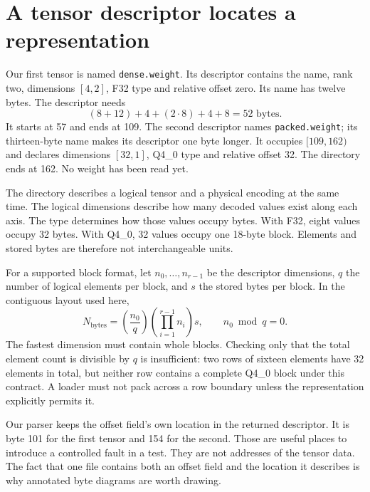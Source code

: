 \section{A tensor descriptor locates a representation}
Our first tensor is named \texttt{dense.weight}. Its descriptor
contains the name, rank two, dimensions $[4,2]$, F32 type and relative
offset zero. Its name has twelve bytes. The descriptor needs
\[
(8+12)+4+(2\cdot8)+4+8=52\text{ bytes}.
\]
It starts at 57 and ends at 109. The second descriptor names
\texttt{packed.weight}; its thirteen-byte name makes its descriptor
one byte longer. It occupies $[109,162)$ and declares dimensions
$[32,1]$, Q4\_0 type and relative offset 32. The directory ends at
162. No weight has been read yet.


The directory describes a logical tensor and a physical encoding at
the same time. The logical dimensions describe how many decoded
values exist along each axis. The type determines how those values
occupy bytes. With F32, eight values occupy 32 bytes. With Q4\_0,
32 values occupy one 18-byte block. Elements and stored bytes
are therefore not interchangeable units.

For a supported block format, let $n_0,\ldots,n_{r-1}$ be the
descriptor dimensions, $q$ the number of logical elements per block,
and $s$ the stored bytes per block. In the contiguous layout used here,
\begin{equation}
N_{\mathrm{bytes}}=
\left(\frac{n_0}{q}\right)
\left(\prod_{i=1}^{r-1}n_i\right)s,
\qquad n_0\bmod q=0.
\label{eq:gguf-block-bytes}
\end{equation}
The fastest dimension must contain whole blocks. Checking only that
the total element count is divisible by $q$ is insufficient: two rows
of sixteen elements have 32 elements in total, but neither row contains
a complete Q4\_0 block under this contract. A loader must not pack
across a row boundary unless the representation explicitly permits it.

Our parser keeps the offset field's own location in the returned
descriptor. It is byte 101 for the first tensor and 154 for the second.
Those are useful places to introduce a controlled fault in a test.
They are not addresses of the tensor data. The fact that one file
contains both an offset field and the location it describes is why
annotated byte diagrams are worth drawing.


